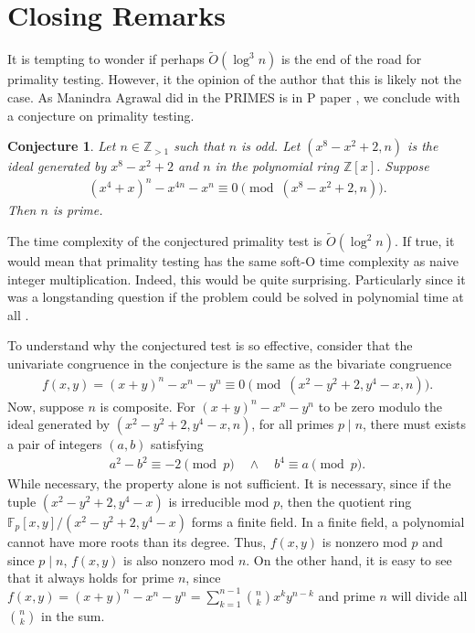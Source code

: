 \documentclass{article}
\theoremstyle{plain}
\newtheorem*{conjecture*}{Conjecture}
\theoremstyle{definition}
\newcommand{\Z}{\mathbb{Z}}
\begin{document}
\section{Closing Remarks}
It is tempting to wonder if perhaps $\tilde{O}(\log^3 n)$ is the end of the road for primality testing. However, it the opinion of the author that this is likely not the case. As Manindra Agrawal did in the PRIMES is in P paper \cite{aks2002}, we conclude with a conjecture on primality testing.
\begin{conjecture*}
Let $n \in \mathbb{Z}_{>1}$ such that $n$ is odd. Let $(x^8 - x^2 + 2, n)$ is the ideal generated by $x^8 - x^2 + 2$ and $n$ in the polynomial ring $\Z[x]$. Suppose
\begin{align*}
    (x^4 + x)^n - x^{4n} - x^n \equiv 0 \pmod{(x^8 - x^2 + 2, n)} .
\end{align*}
Then $n$ is prime.
\end{conjecture*}
The time complexity of the conjectured primality test is $\tilde{O}(\log^2 n)$. If true, it would mean that primality testing has the same soft-O time complexity as naive integer multiplication. Indeed, this would be quite surprising. Particularly since it was a longstanding question if the problem could be solved in polynomial time at all \cite{aks2002, granville2004primes}.

To understand why the conjectured test is so effective, consider that the univariate congruence in the conjecture is the same as the bivariate congruence
\begin{align*}
    f(x,y) = (x+y)^n - x^n - y^n \equiv 0 \pmod{(x^2-y^2+2, y^4-x, n)} .
\end{align*}
Now, suppose $n$ is composite. For $(x+y)^n - x^n - y^n$ to be zero modulo the ideal generated by $(x^2-y^2+2, y^4-x, n)$, for all primes $p \mid n$, there must exists a pair of integers $(a,b)$ satisfying
\begin{align*}
    a^2 - b^2 \equiv -2 \pmod{p} \quad \land \quad b^4 \equiv a \pmod{p} . 
\end{align*}
While necessary, the property alone is not sufficient. It is necessary, since if the tuple $(x^2-y^2+2, y^4-x)$ is irreducible mod $p$, then the quotient ring $\mathbb{F}_p[x,y]/(x^2-y^2+2, y^4-x)$ forms a finite field. In a finite field, a polynomial cannot have more roots than its degree. Thus, $f(x,y)$ is nonzero mod $p$ and since $p \mid n$, $f(x,y)$ is also nonzero mod $n$. On the other hand, it is easy to see that it always holds for prime $n$, since $f(x,y) = (x+y)^n - x^n - y^n = \sum_{k=1}^{n-1} \binom{n}{k} x^k y^{n-k}$ and prime $n$ will divide all $\binom{n}{k}$ in the sum.
\end{document}
